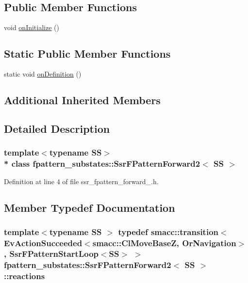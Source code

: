 \subsection*{Public Member Functions}
\begin{DoxyCompactItemize}
\item 
void \hyperlink{structfpattern__substates_1_1SsrFPatternForward2_ae080c618338c88608c0a1df24c78440e}{on\+Initialize} ()
\end{DoxyCompactItemize}
\subsection*{Static Public Member Functions}
\begin{DoxyCompactItemize}
\item 
static void \hyperlink{structfpattern__substates_1_1SsrFPatternForward2_af8fcbd64172279321e512bc35ff1ac4d}{on\+Definition} ()
\end{DoxyCompactItemize}
\subsection*{Additional Inherited Members}


\subsection{Detailed Description}
\subsubsection*{template$<$typename SS$>$\\*
class fpattern\+\_\+substates\+::\+Ssr\+F\+Pattern\+Forward2$<$ S\+S $>$}



Definition at line 4 of file ssr\+\_\+fpattern\+\_\+forward\+\_.\+h.



\subsection{Member Typedef Documentation}
\subsubsection[{\texorpdfstring{reactions}{reactions}}]{\setlength{\rightskip}{0pt plus 5cm}template$<$typename SS $>$ typedef {\bf smacc\+::transition}$<$Ev\+Action\+Succeeded$<${\bf smacc\+::\+Cl\+Move\+BaseZ}, Or\+Navigation$>$, {\bf Ssr\+F\+Pattern\+Start\+Loop}$<$SS$>$ $>$ {\bf fpattern\+\_\+substates\+::\+Ssr\+F\+Pattern\+Forward2}$<$ SS $>$\+::{\bf reactions}}\hypertarget{structfpattern__substates_1_1SsrFPatternForward2_a1beb972a6efbed75d4420b41cce9da34}{}\label{structfpattern__substates_1_1SsrFPatternForward2_a1beb972a6efbed75d4420b41cce9da34}


